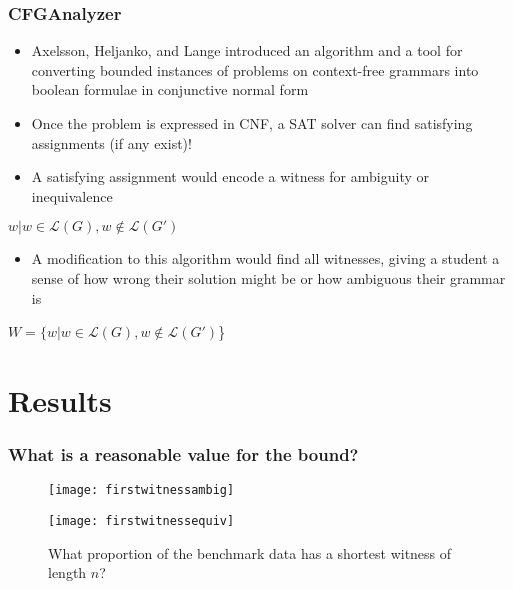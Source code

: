 \documentclass{beamer}
\begin{document}
\begin{frame}
\frametitle {CFGAnalyzer}
\begin{itemize}
\item Axelsson, Heljanko, and Lange introduced an algorithm and a tool for converting bounded instances of problems on context-free grammars into boolean formulae in conjunctive normal form 

\vspace{0.1in}
\end{itemize}


{\begin{itemize} 
\item Once the problem is expressed in CNF, a SAT solver can find satisfying assignments (if any exist)! 
\vspace{0.1in}
\item A satisfying assignment would encode a witness for ambiguity or inequivalence
\end{itemize}
\centering $w | w \in \mathcal{L}(G), w \not \in \mathcal{L}(G')$}

{\begin{itemize}
\item A modification to this algorithm would find all witnesses, giving a student a sense of how wrong their solution might be or how ambiguous their grammar is 
\end{itemize}
\centering $W =\{w | w \in \mathcal{L}(G), w \not \in \mathcal{L}(G')$\}}

\end{frame}

\section{Results}

\begin{frame}
\frametitle{What is a reasonable value for the bound?}
\begin{figure}[H]
	\centering
	\begin{minipage}{0.49\textwidth}
		\centering
		\texttt{[image: firstwitnessambig]}
	\end{minipage}
	\begin{minipage}{0.49\textwidth}
		\centering
		\texttt{[image: firstwitnessequiv]}
	\end{minipage}
	\caption*{What proportion of the benchmark data has a shortest witness of length $n$?}
\end{figure}
\end{frame}
\end{document}
